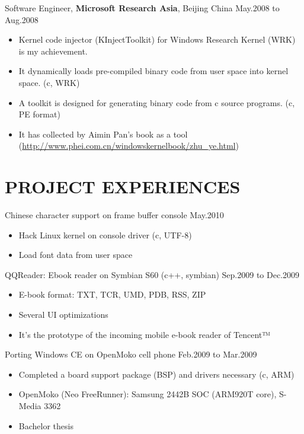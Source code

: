 \documentclass[11pt]{res} %
\begin{document}
\begin{resume}
Software Engineer, \textbf{Microsoft Research Asia}, Beijing China \hfill May.2008 to Aug.2008
\begin{itemize} \itemsep -2pt
\item Kernel code injector (KInjectToolkit) for Windows Research Kernel (WRK) is my achievement.
\item It dynamically loads pre-compiled binary code from user space into kernel space. (c, WRK)
\item A toolkit is designed for generating binary code from c source programs. (c, PE format)
\item It has collected by Aimin Pan's book as a tool
  (\href{http://www.phei.com.cn/windowskernelbook/zhu\_ye.html}{http://www.phei.com.cn/windowskernelbook/zhu\_ye.html})
\end{itemize} 

\section{PROJECT EXPERIENCES}
Chinese character support on frame buffer console \hfill May.2010

\begin{itemize} \itemsep -2pt
\item Hack Linux kernel on console driver (c, UTF-8)
\item Load font data from user space
\end{itemize}

QQReader: Ebook reader on Symbian S60  (c++, symbian) \hfill Sep.2009 to Dec.2009

\begin{itemize} \itemsep -2pt
\item E-book format: TXT, TCR, UMD, PDB, RSS, ZIP
\item Several UI optimizations
\item It’s the prototype of the incoming mobile e-book reader of Tencent™
\end{itemize}

Porting Windows CE on OpenMoko cell phone \hfill Feb.2009 to Mar.2009

\begin{itemize} \itemsep -2pt
\item Completed a board support package (BSP) and drivers necessary (c, ARM)
\item OpenMoko (Neo FreeRunner): Samsung 2442B SOC (ARM920T core), S-Media 3362
\item Bachelor thesis
\end{itemize}


\end{resume}
\end{document}
